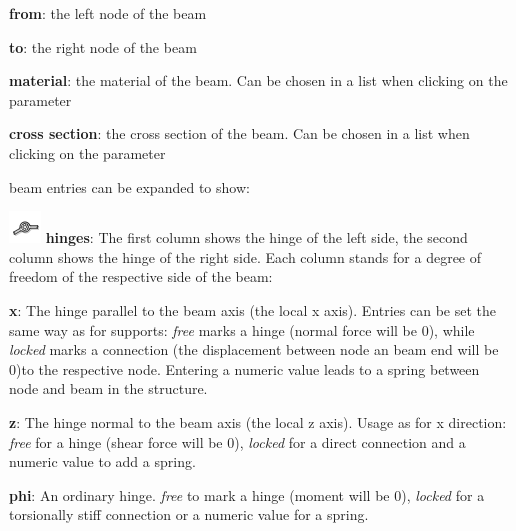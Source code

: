 \documentclass[a4paper,11pt]{report}
\begin{document}
\begin{trivlist}
	\begin{trivlist}
		\leftskip=1cm		
		\item[]\textbf{from}: the left node of the beam
		\item[]\textbf{to}: the right node of the beam
		\item[]\textbf{material}: the material of the beam. Can be chosen in a list when clicking on the parameter
		\item[]\textbf{cross section}: the cross section of the beam. Can be chosen in a list when clicking on the parameter
	\end{trivlist}
	beam entries can be expanded to show:
	\begin{trivlist}
		\leftskip=1cm
		\item[] \includegraphics[scale = 0.5]{../../icons/joint.png} \textbf{hinges}: The first column shows the hinge of the left side, the second column shows the hinge of the right side. Each column stands for a degree of freedom of the respective side of the beam:
		\begin{trivlist}
		\leftskip=2cm
		\item[] \textbf{x}: The hinge parallel to the beam axis (the local x axis). Entries can be set the same way as for supports: \textit{free} marks a hinge (normal force will be 0), while \textit{locked} marks a connection (the displacement between node an beam end will be 0)to the respective node. Entering a numeric value leads to a spring between node and beam in the structure.
		\item[] \textbf{z}: The hinge normal to the beam axis (the local z axis). Usage as for x direction: \textit{free} for a hinge (shear force will be 0), \textit{locked} for a direct connection and a numeric value to add a spring.
		\item[] \textbf{phi}: An ordinary hinge. \textit{free} to mark a hinge (moment will be 0), \textit{locked} for a torsionally stiff connection or a numeric value for a spring.
		\end{trivlist}
	\end{trivlist}
	

\end{trivlist}
\end{document}
